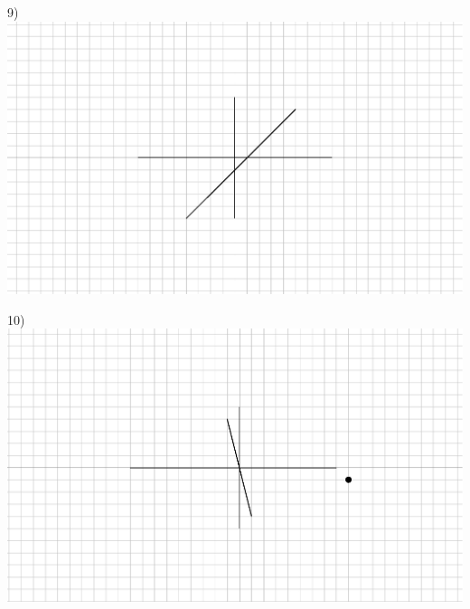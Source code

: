 \begin{multicols}{2}
  
  9)\\
	\includegraphics[scale=.7,bb = 115 65 310 190, clip=true]{II_1_4ap-2.eps}
  
  10)\\
	\includegraphics[scale=.7,bb = 115 65 310 190, clip=true]{II_1_4ap-3.eps}
  
  
  
\end{multicols}


{}

